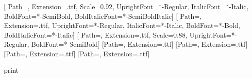 
\usepackage{etoolbox}
\usepackage{graphicx}
\usepackage{eso-pic}
\usepackage{caption}
\usepackage{wrapfig}%
\setlength{\unitlength}{1pt}

\makeatletter

\definecolor{hwAccent}{HTML}{\hwAccentHex}

\setmainfont{IBMPlexSerif}[
  Path=\hwFontDir, Extension=.ttf, Scale=0.92,
  UprightFont=*-Regular, ItalicFont=*-Italic,
  BoldFont=*-SemiBold, BoldItalicFont=*-SemiBoldItalic]
\setsansfont{IBMPlexSansCondensed}[
  Path=\hwFontDir, Extension=.ttf,
  UprightFont=*-Regular, ItalicFont=*-Italic,
  BoldFont=*-Bold, BoldItalicFont=*-Italic]
\setmonofont{IBMPlexMono}[
  Path=\hwFontDir, Extension=.ttf, Scale=0.88,
  UprightFont=*-Regular, BoldFont=*-SemiBold]
\newfontfamily{}[Path=\hwFontDir, Extension=.ttf]
\newfontfamily{}[Path=\hwFontDir, Extension=.ttf]
\newfontfamily{}[Path=\hwFontDir, Extension=.ttf]
\newfontfamily{}[Path=\hwFontDir, Extension=.ttf]

\providecommand\hwTrimWidth{7.5in}
\providecommand\hwTrimHeight{9.25in}
\providecommand\hwBleed{0.125in}
\def\hw@print{print}
\newlength\hw@bleed
\ifx\hwMode\hw@print
  \setlength\hw@bleed{\hwBleed}
  \setstocksize{\dimexpr\hwTrimHeight+2\hw@bleed\relax}{\dimexpr\hwTrimWidth+\hw@bleed\relax}
  \settrimmedsize{\hwTrimHeight}{\hwTrimWidth}{*}
  \settrims{\hw@bleed}{\hw@bleed}
  \setlrmarginsandblock{0.875in}{0.625in}{*}
\else
  \setlength\hw@bleed{0pt}
  \setstocksize{\hwTrimHeight}{\hwTrimWidth}
  \settrimmedsize{\hwTrimHeight}{\hwTrimWidth}{*}
  \settrims{0pt}{0pt}
  \setlrmarginsandblock{0.75in}{0.75in}{*}
\fi
\setulmarginsandblock{0.75in}{1in}{*}
\setheadfoot{12pt}{0.45in}
\setheaderspaces{*}{12pt}{*}
\checkandfixthelayout[nearest]

